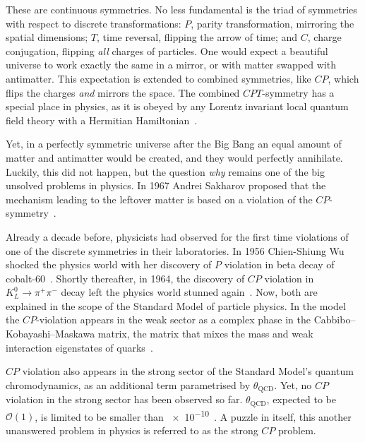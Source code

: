 These are continuous symmetries. No less fundamental is the triad of symmetries with respect to discrete transformations: $P$, parity transformation, mirroring the spatial dimensions; $T$, time reversal, flipping the arrow of time; and $C$, charge conjugation, flipping \emph{all} charges of particles. One would expect a beautiful universe to work exactly the same in a mirror, or with matter swapped with antimatter. This expectation is extended to combined symmetries, like $CP$, which flips the charges \emph{and} mirrors the space. The combined $CPT$-symmetry has a special place in physics, as it is obeyed by any Lorentz invariant local quantum field theory with a Hermitian Hamiltonian~\cite{Sachs1987}.

Yet, in a perfectly symmetric universe after the Big Bang an equal amount of matter and antimatter would be created, and they would perfectly annihilate. Luckily, this did not happen, but the question \emph{why} remains one of the big unsolved problems in physics.
In 1967 Andrei Sakharov proposed that the mechanism leading to the leftover matter  is based on a violation of the $CP$-symmetry~\cite{0038-5670-34-5-A08}.

Already a decade before, physicists had observed for the first time violations of one of the discrete symmetries in their laboratories.
In 1956 Chien-Shiung Wu shocked the physics world with her discovery of $P$ violation in beta decay of cobalt-60~\cite{PhysRev.105.1413}. Shortly thereafter, in 1964, the discovery of $CP$ violation in $K^0_L \rightarrow \pi^+ \pi^-$ decay left the physics world stunned again~\cite{PhysRevLett.13.138}. Now, both are explained in the scope of the Standard Model of particle physics. In the model the $CP$-violation appears in the weak sector as a complex phase in the Cabbibo--Kobayashi--Maskawa matrix, the matrix that mixes the mass and weak interaction eigenstates of quarks~\cite{doi:10.1143/PTP.49.652}.

$CP$ violation also appears in the strong sector of the Standard Model's quantum chromodynamics, as an additional term parametrised by $\theta_\text{QCD}$. Yet, no $CP$ violation in the strong sector has been observed so far. $\theta_\text{QCD}$, expected to be $\mathcal{O}(1)$, is limited to be smaller than \num{e-10}~\cite{PDG2016}. A puzzle in itself, this another unanswered problem in physics is referred to as the strong $CP$ problem.

